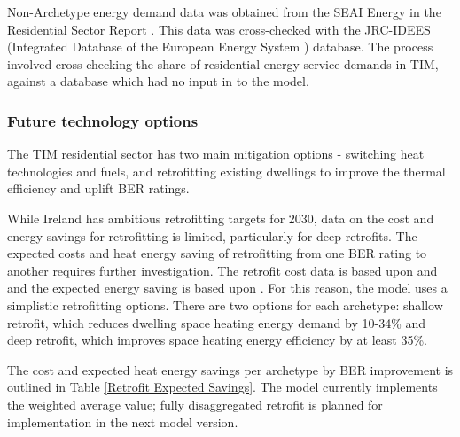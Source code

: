 \documentclass[gmd,manuscript]{copernicus}
\begin{document}
Non-Archetype energy demand data was obtained from the SEAI Energy in the Residential Sector Report \citep{SEAISustainableAuthorityofIreland2018}. This data was cross-checked with the JRC-IDEES (Integrated Database of the European Energy System ) database. The process involved cross-checking the share of residential energy service demands in TIM, against a database which had no input in to the model.

\subsubsection{Future technology options}
The TIM residential sector has two main mitigation options - switching heat technologies and fuels, and retrofitting existing dwellings to improve the thermal efficiency and uplift BER ratings. 

While Ireland has ambitious retrofitting targets for 2030, data on the cost and energy savings for retrofitting is limited, particularly for deep retrofits. The expected costs and heat energy saving of retrofitting from one BER rating to another requires further investigation. The retrofit cost data is based upon \citep{AECOMDECLG2013} and \citep{Ali2020} and the expected energy saving is based upon \citep{Collins2017b}. For this reason, the model uses a simplistic retrofitting options. There are two options for each archetype: shallow retrofit, which reduces dwelling space heating energy demand by 10-34\% and deep retrofit, which improves space heating energy efficiency by at least 35\%. 

The cost and expected heat energy savings per archetype by BER improvement is outlined in Table \ref{Retrofit Expected Savings}. The model currently implements the weighted average value; fully disaggregated retrofit is planned for implementation in the next model version.
\end{document}
